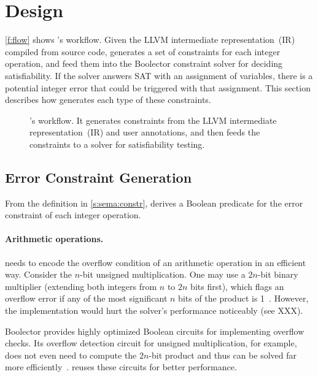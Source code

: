 \section{Design}
\label{s:gen}

\autoref{f:flow} shows \sys's workflow.  Given the LLVM intermediate
representation~(IR) compiled from source code, \sys generates a set
of constraints for each integer operation, and feed them into the
Boolector constraint solver for deciding satisfiability.  If the
solver answers SAT with an assignment of variables, there is a
potential integer error that could be triggered with that assignment.
This section describes how \sys generates each type of these
constraints.

\begin{figure}
\centering
\resizebox{\linewidth}{!}{

}
\caption{\sys's workflow.  It generates constraints from the LLVM
intermediate representation~(IR) and user annotations, and then feeds
the constraints to a solver for satisfiability testing.}
\label{f:flow}
\end{figure}

\subsection{Error Constraint Generation}
\label{s:gen:err}

From the definition in \autoref{s:sema:constr}, \sys derives a
Boolean predicate for the error constraint of each integer operation.

\paragraph{Arithmetic operations.}
\sys needs to encode the overflow condition of an arithmetic operation
in an efficient way.  Consider the $n$-bit unsigned multiplication.
One may use a $2n$-bit binary multiplier (extending both integers
from $n$ to $2n$ bits first), which flags an overflow error if any
of the most significant $n$ bits of the product is
1~\cite{molnar:catchconv}.  However, the \naive implementation would
hurt the solver's performance noticeably (see XXX).

Boolector provides highly optimized Boolean circuits for implementing
overflow checks.  Its overflow detection circuit for unsigned
multiplication, for example, does not even need to compute the
$2n$-bit product and thus can be solved far more
efficiently~\cite[\chapterautorefname~3.5]{brummayer:phd}.  \sys
reuses these circuits for better performance.

